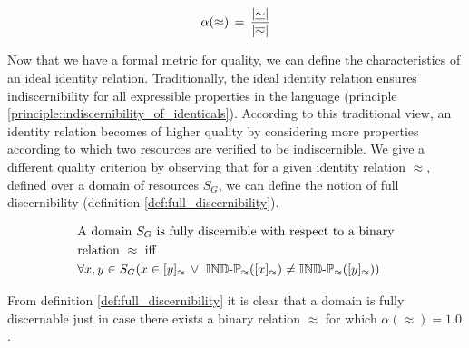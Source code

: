 \begin{definition}[Quality]
\label{def:quality}
\begin{align}
  \alpha(\approx)
\, = \,
  \dfrac{
    \lvert\underline{\sim}\rvert
  }{
    \lvert\overline{\sim}\rvert
  }\nonumber
\end{align}
\end{definition}

\noindent Now that we have a formal metric for quality,
  we can define the characteristics of an ideal identity relation.
Traditionally, the ideal identity relation ensures indiscernibility
  for all expressible properties in the language
  (principle \ref{principle:indiscernibility_of_identicals}).
According to this traditional view, an identity relation becomes of
  higher quality by considering more properties
  according to which two resources are verified to be indiscernible.
We give a different quality criterion by observing that
  for a given identity relation $\approx$,
  defined over a domain of resources $S_G$,
  we can define the notion of full discernibility
  (definition \ref{def:full_discernibility}).

\begin{definition}
\label{def:full_discernibility}
\begin{align}
& \text{A domain } S_G
  \text{ is fully discernible with respect to a binary}\nonumber\\
& \text{relation } \approx \text{ iff}\nonumber\\
& \forall x,y \in S_G (
    x \in [y]_{\approx}
  \,\lor\,\,
    \operatorname{{\mathbb{IND}-\mathbb{P}}}_{\approx}([x]_{\approx}) \neq \operatorname{{\mathbb{IND}-\mathbb{P}}}_{\approx}([y]_{\approx})
  )\nonumber
\end{align}
\end{definition}

\noindent From definition \ref{def:full_discernibility}
  it is clear that a domain is fully discernable just in case
  there exists a binary relation $\approx$
  for which \mbox{$\alpha(\approx) = 1.0$}.

\begin{comment}
\begin{definition}[Higher \& lower approximation]
\label{def:higher_lower_approximation}
\begin{align}
  y \in [x]_H
\,\iff\,\\
  \exists u (
      \card{[u]_{\sim}}>1
    \,\land\,
      \mathbb{P}([u]_{\sim})=\mathbb{P}(\set{x,y})
  )\nonumber
\\
  y \in [x]_L
\,\iff\,
  \forall S \subseteq D (\\
      (\card{S}>1 \,\land\, \mathbb{P}(S) = \mathbb{P}(\set{x,y}))
    \,\rightarrow\,
      \exists s \in D (S=[s]_{\sim})
  )\nonumber
\end{align}
\end{definition}
\end{comment}

